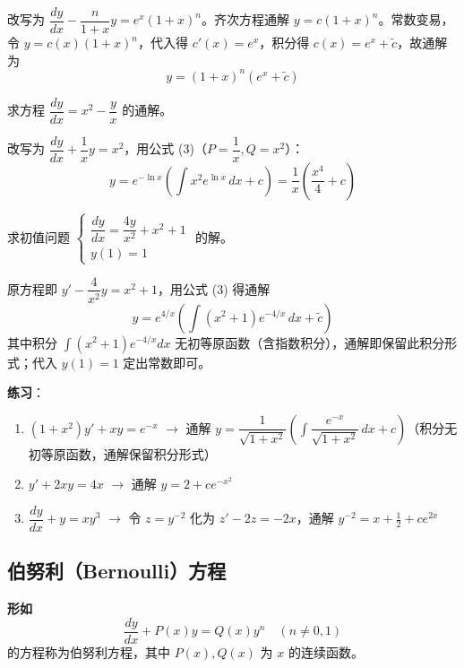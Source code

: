 \begin{solution}
改写为 $\dfrac{dy}{dx} - \dfrac{n}{1+x}y = e^x(1+x)^n$。齐次方程通解 $y = c(1+x)^n$。常数变易，令 $y = c(x)(1+x)^n$，代入得 $c'(x) = e^x$，积分得 $c(x) = e^x + \tilde{c}$，故通解为
$$y = (1+x)^n(e^x + \tilde{c})$$
\end{solution}

\begin{example}
求方程 $\dfrac{dy}{dx} = x^2 - \dfrac{y}{x}$ 的通解。
\end{example}

\begin{solution}
改写为 $\dfrac{dy}{dx} + \dfrac{1}{x}y = x^2$，用公式 (3)（$P = \dfrac{1}{x}, Q = x^2$）：
$$y = e^{-\ln x}\left(\int x^2 e^{\ln x}\,dx + c\right) = \frac{1}{x}\left(\frac{x^4}{4} + c\right)$$
\end{solution}

\begin{example}
求初值问题 $\begin{cases} \dfrac{dy}{dx} = \dfrac{4y}{x^2} + x^2 + 1 \\ y(1) = 1 \end{cases}$ 的解。
\end{example}

\begin{solution}
原方程即 $y' - \dfrac{4}{x^2}y = x^2+1$，用公式 (3) 得通解
$$y = e^{4/x}\left(\int (x^2+1)e^{-4/x}\,dx + \tilde{c}\right)$$
其中积分 $\int(x^2+1)e^{-4/x}dx$ 无初等原函数（含指数积分），通解即保留此积分形式；代入 $y(1) = 1$ 定出常数即可。
\end{solution}

\textbf{练习}：
\begin{enumerate}
    \item $(1+x^2)y' + xy = e^{-x}$ $\rightarrow$ 通解 $y = \dfrac{1}{\sqrt{1+x^2}}\left(\int \dfrac{e^{-x}}{\sqrt{1+x^2}}\,dx + c\right)$（积分无初等原函数，通解保留积分形式）
    \item $y' + 2xy = 4x$ $\rightarrow$ 通解 $y = 2 + ce^{-x^2}$
    \item $\dfrac{dy}{dx} + y = xy^3$ $\rightarrow$ 令 $z = y^{-2}$ 化为 $z' - 2z = -2x$，通解 $y^{-2} = x + \frac{1}{2} + ce^{2x}$
\end{enumerate}

\subsection{伯努利（Bernoulli）方程}

\textbf{形如}
$$\frac{dy}{dx} + P(x)y = Q(x)y^n \quad (n \neq 0, 1)$$
的方程称为伯努利方程，其中 $P(x), Q(x)$ 为 $x$ 的连续函数。

